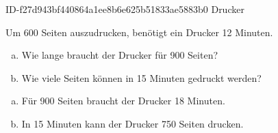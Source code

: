 \begin{exercise}
      {ID-f27d943bf440864a1ee8b6e625b51833ae5883b0}
      {Drucker}
  \ifproblem\problem\par
    Um \num{600} Seiten auszudrucken, benötigt ein Drucker \num{12} Minuten.
    \begin{enumerate}[a)]
      \item Wie lange braucht der Drucker für \num{900} Seiten?
      \item Wie viele Seiten können in \num{15} Minuten gedruckt werden?
    \end{enumerate}
  \fi
  \ifoutcome\outcome\par
    \begin{enumerate}[a)]
      \item Für \num{900} Seiten braucht der Drucker \num{18} Minuten.
      \item In \num{15} Minuten kann der Drucker \num{750} Seiten drucken.
    \end{enumerate}
  \fi
\end{exercise}
